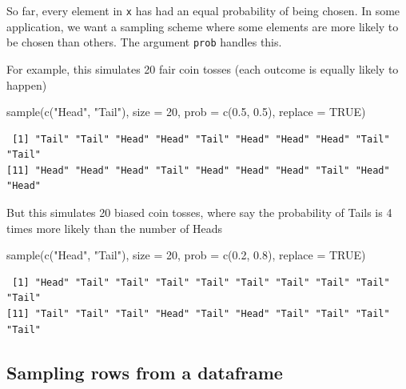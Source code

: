 \documentclass[
  letterpaper,
]{book}
\newenvironment{Shaded}{\begin{snugshade}}{\end{snugshade}}
\newcommand{\AttributeTok}[1]{\textcolor[rgb]{0.40,0.45,0.13}{#1}}
\newcommand{\ConstantTok}[1]{\textcolor[rgb]{0.56,0.35,0.01}{#1}}
\newcommand{\DecValTok}[1]{\textcolor[rgb]{0.68,0.00,0.00}{#1}}
\newcommand{\FloatTok}[1]{\textcolor[rgb]{0.68,0.00,0.00}{#1}}
\newcommand{\FunctionTok}[1]{\textcolor[rgb]{0.28,0.35,0.67}{#1}}
\newcommand{\NormalTok}[1]{\textcolor[rgb]{0.00,0.23,0.31}{#1}}
\newcommand{\StringTok}[1]{\textcolor[rgb]{0.13,0.47,0.30}{#1}}
\theoremstyle{definition}
\theoremstyle{definition}
\theoremstyle{plain}
\theoremstyle{definition}
\theoremstyle{plain}
\theoremstyle{plain}
\theoremstyle{remark}
\begin{document}
So far, every element in \texttt{x} has had an equal probability of
being chosen. In some application, we want a sampling scheme where some
elements are more likely to be chosen than others. The argument
\texttt{prob} handles this.

For example, this simulates 20 fair coin tosses (each outcome is equally
likely to happen)

\begin{Shaded}
\begin{Highlighting}[]
\FunctionTok{sample}\NormalTok{(}\FunctionTok{c}\NormalTok{(}\StringTok{"Head"}\NormalTok{, }\StringTok{"Tail"}\NormalTok{), }\AttributeTok{size =} \DecValTok{20}\NormalTok{, }\AttributeTok{prob =} \FunctionTok{c}\NormalTok{(}\FloatTok{0.5}\NormalTok{, }\FloatTok{0.5}\NormalTok{), }\AttributeTok{replace =} \ConstantTok{TRUE}\NormalTok{)}
\end{Highlighting}
\end{Shaded}

\begin{verbatim}
 [1] "Tail" "Tail" "Head" "Head" "Tail" "Head" "Head" "Head" "Tail" "Tail"
[11] "Head" "Head" "Head" "Tail" "Head" "Head" "Head" "Tail" "Head" "Head"
\end{verbatim}

But this simulates 20 biased coin tosses, where say the probability of
Tails is 4 times more likely than the number of Heads

\begin{Shaded}
\begin{Highlighting}[]
\FunctionTok{sample}\NormalTok{(}\FunctionTok{c}\NormalTok{(}\StringTok{"Head"}\NormalTok{, }\StringTok{"Tail"}\NormalTok{), }\AttributeTok{size =} \DecValTok{20}\NormalTok{, }\AttributeTok{prob =} \FunctionTok{c}\NormalTok{(}\FloatTok{0.2}\NormalTok{, }\FloatTok{0.8}\NormalTok{), }\AttributeTok{replace =} \ConstantTok{TRUE}\NormalTok{)}
\end{Highlighting}
\end{Shaded}

\begin{verbatim}
 [1] "Head" "Tail" "Tail" "Tail" "Tail" "Tail" "Tail" "Tail" "Tail" "Tail"
[11] "Tail" "Tail" "Tail" "Head" "Tail" "Head" "Tail" "Tail" "Tail" "Tail"
\end{verbatim}

\hypertarget{sampling-rows-from-a-dataframe}{%
\subsection{Sampling rows from a
dataframe}\label{sampling-rows-from-a-dataframe}}
\end{document}
